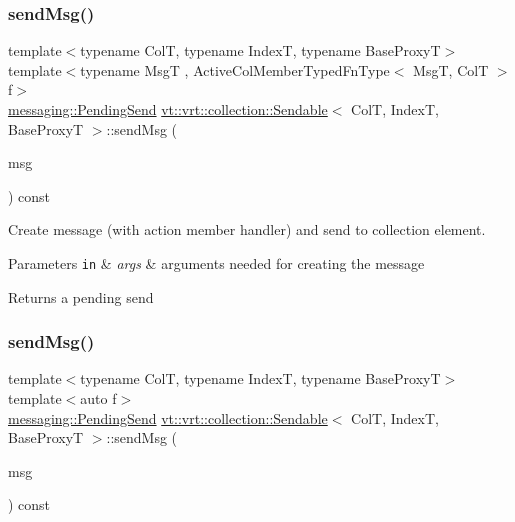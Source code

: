 \subsubsection{\texorpdfstring{send\+Msg()}{sendMsg()}\hspace{0.1cm}{\footnotesize\ttfamily [2/3]}}
{\footnotesize\ttfamily template$<$typename ColT, typename IndexT, typename Base\+ProxyT$>$ \\
template$<$typename MsgT , Active\+Col\+Member\+Typed\+Fn\+Type$<$ Msg\+T, Col\+T $>$ f$>$ \\
\hyperlink{structvt_1_1messaging_1_1_pending_send}{messaging\+::\+Pending\+Send} \hyperlink{structvt_1_1vrt_1_1collection_1_1_sendable}{vt\+::vrt\+::collection\+::\+Sendable}$<$ ColT, IndexT, Base\+ProxyT $>$\+::send\+Msg (\begin{DoxyParamCaption}\item[{\hyperlink{structvt_1_1messaging_1_1_msg_ptr_thief}{messaging\+::\+Msg\+Ptr\+Thief}$<$ MsgT $>$}]{msg }\end{DoxyParamCaption}) const}



Create message (with action member handler) and send to collection element. 


\begin{DoxyParams}[1]{Parameters}
\mbox{\tt in}  & {\em args} & arguments needed for creating the message\\
\hline
\end{DoxyParams}
\begin{DoxyReturn}{Returns}
a pending send 
\end{DoxyReturn}
\mbox{\label{structvt_1_1vrt_1_1collection_1_1_sendable_adb5d41d0563ccc3d9b29f547d2b45687}} 
\subsubsection{\texorpdfstring{send\+Msg()}{sendMsg()}\hspace{0.1cm}{\footnotesize\ttfamily [3/3]}}
{\footnotesize\ttfamily template$<$typename ColT, typename IndexT, typename Base\+ProxyT$>$ \\
template$<$auto f$>$ \\
\hyperlink{structvt_1_1messaging_1_1_pending_send}{messaging\+::\+Pending\+Send} \hyperlink{structvt_1_1vrt_1_1collection_1_1_sendable}{vt\+::vrt\+::collection\+::\+Sendable}$<$ ColT, IndexT, Base\+ProxyT $>$\+::send\+Msg (\begin{DoxyParamCaption}\item[{\hyperlink{structvt_1_1messaging_1_1_msg_ptr_thief}{messaging\+::\+Msg\+Ptr\+Thief}$<$ typename \hyperlink{structvt_1_1_obj_func_traits}{Obj\+Func\+Traits}$<$ decltype(f)$>$\+::MsgT $>$}]{msg }\end{DoxyParamCaption}) const\hspace{0.3cm}{\ttfamily [inline]}}



